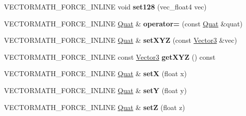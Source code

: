 \begin{DoxyCompactItemize}
\item 
\mbox{\label{classVectormath_1_1Aos_1_1Quat_a40df4361da2c782091f24749349812f7}} 
V\+E\+C\+T\+O\+R\+M\+A\+T\+H\+\_\+\+F\+O\+R\+C\+E\+\_\+\+I\+N\+L\+I\+NE void {\bfseries set128} (vec\+\_\+float4 vec)
\item 
\mbox{\label{classVectormath_1_1Aos_1_1Quat_a60c4c39e0aab60957f341978df7ef64e}} 
V\+E\+C\+T\+O\+R\+M\+A\+T\+H\+\_\+\+F\+O\+R\+C\+E\+\_\+\+I\+N\+L\+I\+NE \hyperlink{classVectormath_1_1Aos_1_1Quat}{Quat} \& {\bfseries operator=} (const \hyperlink{classVectormath_1_1Aos_1_1Quat}{Quat} \&quat)
\item 
\mbox{\label{classVectormath_1_1Aos_1_1Quat_a9bc1efa2dcf5094f5e887d618c578340}} 
V\+E\+C\+T\+O\+R\+M\+A\+T\+H\+\_\+\+F\+O\+R\+C\+E\+\_\+\+I\+N\+L\+I\+NE \hyperlink{classVectormath_1_1Aos_1_1Quat}{Quat} \& {\bfseries set\+X\+YZ} (const \hyperlink{classVectormath_1_1Aos_1_1Vector3}{Vector3} \&vec)
\item 
\mbox{\label{classVectormath_1_1Aos_1_1Quat_a8e0a884121d4b8ad24f3a73b46917520}} 
V\+E\+C\+T\+O\+R\+M\+A\+T\+H\+\_\+\+F\+O\+R\+C\+E\+\_\+\+I\+N\+L\+I\+NE const \hyperlink{classVectormath_1_1Aos_1_1Vector3}{Vector3} {\bfseries get\+X\+YZ} () const
\item 
\mbox{\label{classVectormath_1_1Aos_1_1Quat_aa81055791b8260434535fbdad4c893c2}} 
V\+E\+C\+T\+O\+R\+M\+A\+T\+H\+\_\+\+F\+O\+R\+C\+E\+\_\+\+I\+N\+L\+I\+NE \hyperlink{classVectormath_1_1Aos_1_1Quat}{Quat} \& {\bfseries setX} (float x)
\item 
\mbox{\label{classVectormath_1_1Aos_1_1Quat_a04649b4fc35e945951a10513f6442b71}} 
V\+E\+C\+T\+O\+R\+M\+A\+T\+H\+\_\+\+F\+O\+R\+C\+E\+\_\+\+I\+N\+L\+I\+NE \hyperlink{classVectormath_1_1Aos_1_1Quat}{Quat} \& {\bfseries setY} (float y)
\item 
\mbox{\label{classVectormath_1_1Aos_1_1Quat_a2603ed260d356625641751944bb9b13e}} 
V\+E\+C\+T\+O\+R\+M\+A\+T\+H\+\_\+\+F\+O\+R\+C\+E\+\_\+\+I\+N\+L\+I\+NE \hyperlink{classVectormath_1_1Aos_1_1Quat}{Quat} \& {\bfseries setZ} (float z)

\end{DoxyCompactItemize}
